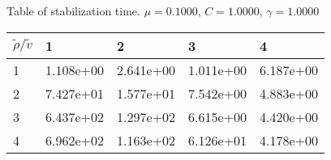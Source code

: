 \begin{center}
Table of stabilization time. $\mu = 0.1000$, $C = 1.0000$, $\gamma = 1.0000$
  
\begin{tabular}{|p{0.8in}|p{0.8in}|p{0.8in}|p{0.8in}|p{0.8in}|} \hline
$\tilde{\rho} / \tilde{v}$ &1 &2 &3 &4 \\ \hline 
1 &1.108e+00 &2.641e+00 &1.011e+00 &6.187e+00 \\ \hline 
2 &7.427e+01 &1.577e+01 &7.542e+00 &4.883e+00 \\ \hline 
3 &6.437e+02 &1.297e+02 &6.615e+00 &4.420e+00 \\ \hline 
4 &6.962e+02 &1.163e+02 &6.126e+01 &4.178e+00 \\ \hline 

\end{tabular}\\[20pt]
\end{center}
